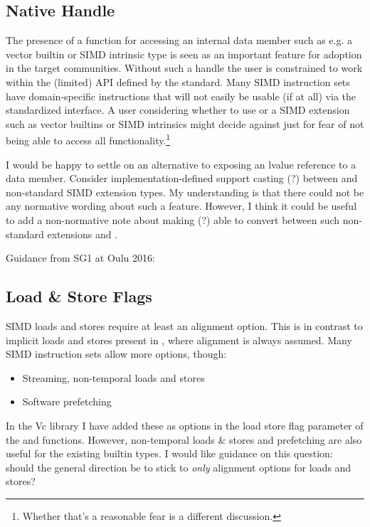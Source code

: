 \subsection{Native Handle}\label{sec:native}
The presence of a  function for accessing an internal data member such as e.g. a vector builtin or SIMD intrinsic type is seen as an important feature for adoption in the target communities.
Without such a handle the user is constrained to work within the (limited) API defined by the standard.
Many SIMD instruction sets have domain-specific instructions that will not easily be usable (if at all) via the standardized interface.
A user considering whether to use \datapar or a SIMD extension such as vector builtins or SIMD intrinsics might decide against \datapar just for fear of not being able to access all functionality.\footnote{
  Whether that's a reasonable fear is a different discussion.
}

I would be happy to settle on an alternative to exposing an lvalue reference to a data member.
Consider implementation-defined support casting (?) between \datapar and non-standard SIMD extension types.
My understanding is that there could not be any normative wording about such a feature.
However, I think it could be useful to add a non-normative note about making (?) able to convert between such non-standard extensions and \datapar.

Guidance from SG1 at Oulu 2016:\\

\subsection{Load \& Store Flags}\label{sec:flags}
SIMD loads and stores require at least an alignment option.
This is in contrast to implicit loads and stores present in \CC{}, where alignment is always assumed.
Many SIMD instruction sets allow more options, though:
\begin{itemize}
  \item Streaming, non-temporal loads and stores
  \item Software prefetching
\end{itemize}
In the Vc library I have added these as options in the load store flag parameter of the  and  functions.
However, non-temporal loads \& stores and prefetching are also useful for the existing builtin types.
I would like guidance on this question: should the general direction be to stick to \emph{only} alignment options for \datapar loads and stores?

